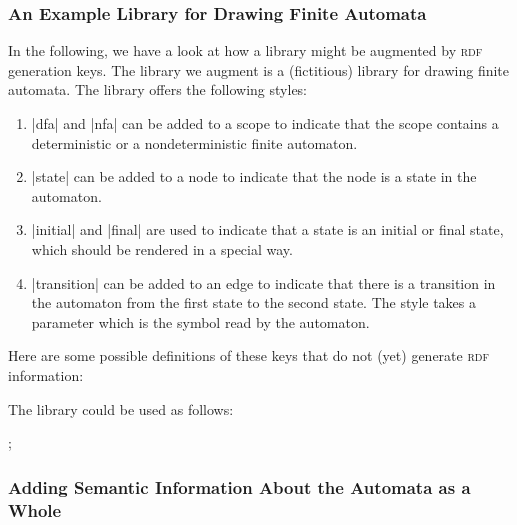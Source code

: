 \subsubsection{An Example Library for Drawing Finite Automata}

In the following, we have a look at how a library might be augmented by
\textsc{rdf} generation keys. The library we augment is a (fictitious) library
for drawing finite automata. The library offers the following styles:
%
\begin{enumerate}
    \item |dfa| and |nfa| can be added to a scope to indicate that the scope
        contains a deterministic or a nondeterministic finite automaton.
    \item |state| can be added to a node to indicate that the node is a state
        in the automaton.
    \item |initial| and |final| are used to indicate that a state is an initial
        or final state, which should be rendered in a special way.
    \item |transition| can be added to an edge to indicate that there is a
        transition in the automaton from the first state to the second state.
        The style takes a parameter which is the symbol read by the automaton.
\end{enumerate}

Here are some possible definitions of these keys that do not (yet) generate
\textsc{rdf} information:
%
\begin{codeexample}
\end{codeexample}

The library could be used as follows:
%
\begin{codeexample}[width=5cm,preamble={\usetikzlibrary{graphs,rdf}}]
\tikz [dfa]
  ;
\end{codeexample}


\subsubsection{Adding Semantic Information About the Automata as a Whole}

